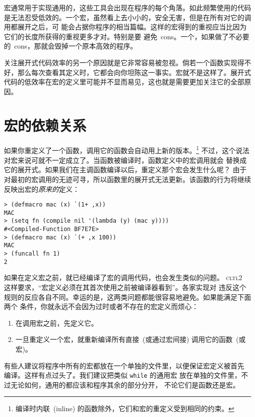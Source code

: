 宏通常用于实现通用的\utility{}，这些工具会出现在程序的每个角落。如此频繁使用的代码
是无法忍受低效的。一个宏，虽然看上去小小的，安全无害，但是在所有对它的调用都展开之后，可
能会占据你程序的相当篇幅。这样的宏得到的重视应当比因为它们的长度所获得的重视更多才对。特别是要
避免~cons。一个\utility{}，如果做了不必要的~cons，那就会毁掉一个原本高效的程序。

关注展开式代码效率的另一个原因就是它非常容易被忽视。倘若一个函数实现得不好，那么每次查看其定义时，它都会向你坦陈这一事实。宏就不是这样了。展开式代码的低效率在宏的定义里可能并不显而易见，这也就是需要更加关注它的全部原因。

\section{宏的依赖关系}
\label{sec:dependence_on_macros}

如果你重定义了一个函数，调用它的函数会自动用上新的版本。\footnote{
编译时内联~(inline) 的函数除外，它们和宏的重定义受到相同的约束。}
不过，这个说法对宏来说可就不一定成立了。当函数被编译时，函数定义中的宏调用就会
替换成它的展开式。如果我们在主调函数编译以后，重定义那个宏会发生什么呢？
由于对最初的宏调用的无迹可寻，所以函数里的展开式无法更新。该函数的行为将继续
反映出宏的\emph{原来的}定义：
\begin{lstlisting}
> (defmacro mac (x) `(1+ ,x))
MAC
> (setq fn (compile nil '(lambda (y) (mac y))))
#<Compiled-Function BF7E7E>
> (defmacro mac (x) `(+ ,x 100))
MAC
> (funcall fn 1)
2
\end{lstlisting}

如果在定义宏之前，就已经编译了宏的调用代码，也会发生类似的问题。
\textsc{cltl}2 这样要求，“宏定义必须在其首次使用之前被编译器看到”。各家实现对
违反这个规则的反应各自不同。幸运的是，这两类问题都能很容易地避免。如果能满足下面两个
条件，你就永远不会因为过时或者不存在的宏定义而烦心：
\begin{enumerate}
 \item 在调用宏之前，先定义它。
 \item 一旦重定义一个宏，就重新编译所有直接~(或通过宏间接) 调用它的函数~(或宏)。
\end{enumerate}

有些人建议将程序中所有的宏都放在一个单独的文件里，以便保证宏定义被首先
编译。这样有点过头了。我们建议把类似 \verb|while| 的通用宏
放在单独的文件里，不过无论如何，通用的\utility{}都应该和程序其余的部分分开，
不论它们是函数还是宏。

